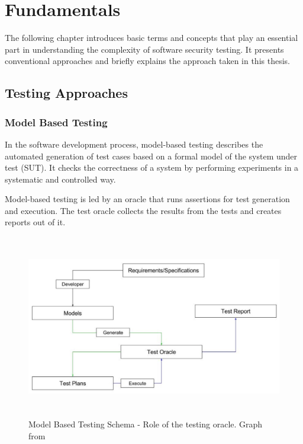 
\addchapheadtotoc
\chapter{Fundamentals}
The following chapter introduces basic terms and concepts that play an essential part in understanding the complexity of software security testing. It presents conventional approaches and briefly explains the approach taken in this thesis.

\section{Testing Approaches}
\subsection{Model Based Testing}
In the software development process, model-based testing describes the automated generation of test cases based on a formal model of the system under test (SUT). It checks the correctness of a system by performing experiments in a systematic and controlled way. \citep{torxAMBT2003}

Model-based testing is led by an oracle that runs assertions for test generation and execution.
The test oracle collects the results from the tests and creates reports out of it. \citep{sypolt2018}

\newpage 

\begin{figure}[ht!]
\begin{center}
\includegraphics[height=8cm]{modelbasedtesting_sypolt.jpg}
\end{center}
\caption[Model Based Testing Schema - Role of the testing oracle]{Model Based Testing Schema - Role of the testing oracle. Graph from \citep{sypolt2018}}
\label{fig_devsecops}
\end{figure}

